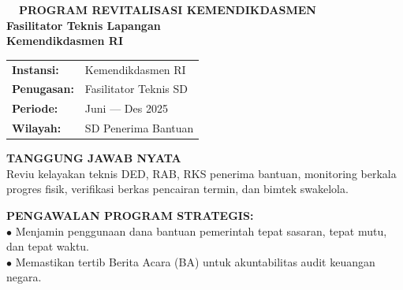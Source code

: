 \documentclass[10pt,a4paper,landscape]{article}
\begin{document}
\noindent
\begin{minipage}[t]{0.30\linewidth}
  \vspace{0pt}
  \begin{tcolorbox}[sharp corners, boxrule=0.8pt, colframe=pborder, colback=white, left=3mm, right=3mm, top=2.5mm, bottom=2.5mm, height=100mm]
    \colorbox{pred}{\fontsize{7pt}{8pt}\selectfont\bfseries\color{white}\ \ PROGRAM REVITALISASI KEMENDIKDASMEN\ \ }\\[1.5mm]
    {\fontsize{9.5pt}{11.5pt}\selectfont\bfseries\color{pnavy}Fasilitator Teknis Lapangan}\\[0.5mm]
    {\fontsize{7pt}{8.5pt}\selectfont\bfseries\color{pred}Kemendikdasmen RI}\\[2mm]

    \begin{tcolorbox}[sharp corners, boxrule=0.5pt, colframe=pborder, colback=pbglight, left=2mm, right=2mm, top=1.5mm, bottom=1.5mm]
      \begin{tabularx}{\linewidth}{@{}p{22mm} X@{}}
        {\fontsize{6.8pt}{8pt}\selectfont\bfseries Instansi:} & {\fontsize{6.8pt}{8pt}\selectfont Kemendikdasmen RI} \\[0.8mm]
        {\fontsize{6.8pt}{8pt}\selectfont\bfseries Penugasan:} & {\fontsize{6.8pt}{8pt}\selectfont Fasilitator Teknis SD} \\[0.8mm]
        {\fontsize{6.8pt}{8pt}\selectfont\bfseries Periode:} & {\fontsize{6.8pt}{8pt}\selectfont Juni --- Des 2025} \\[0.8mm]
        {\fontsize{6.8pt}{8pt}\selectfont\bfseries Wilayah:} & {\fontsize{6.8pt}{8pt}\selectfont SD Penerima Bantuan}
      \end{tabularx}
    \end{tcolorbox}
    \vspace{1.5mm}

    {\fontsize{7.5pt}{9pt}\selectfont\bfseries\color{pnavy}TANGGUNG JAWAB NYATA}\\[0.8mm]
    {\fontsize{6.5pt}{8.2pt}\selectfont\color{psteel}
    Reviu kelayakan teknis DED, RAB, RKS penerima bantuan, monitoring berkala progres fisik, verifikasi berkas pencairan termin, dan bimtek swakelola.
    }
  \end{tcolorbox}
  \vspace{2mm}

  \begin{tcolorbox}[sharp corners, boxrule=0.6pt, colframe=pnavy, colback=pbglight, left=2.5mm, right=2.5mm, top=2mm, bottom=2mm, height=52mm]
    {\fontsize{7pt}{8.5pt}\selectfont\bfseries\color{pnavy}PENGAWALAN PROGRAM STRATEGIS:}\\[1.5mm]
    {\fontsize{6.5pt}{8.2pt}\selectfont\color{psteel}
    $\bullet$ Menjamin penggunaan dana bantuan pemerintah tepat sasaran, tepat mutu, dan tepat waktu.\\
    $\bullet$ Memastikan tertib Berita Acara (BA) untuk akuntabilitas audit keuangan negara.
    }
  \end{tcolorbox}
\end{minipage}%
\end{document}
